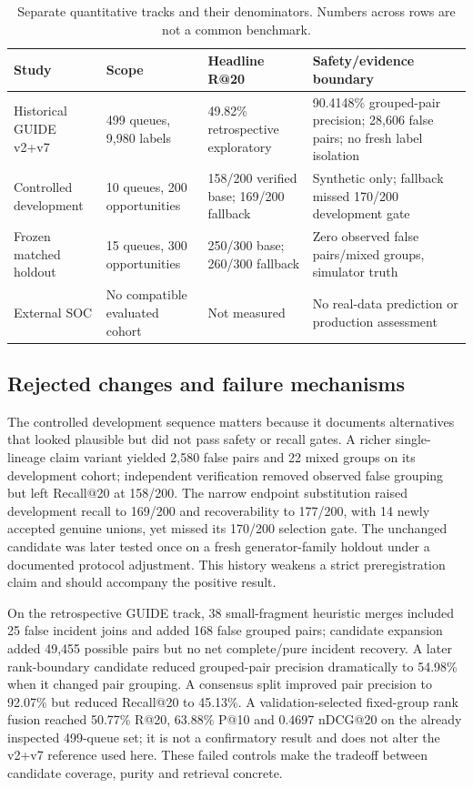 \begin{table}[t]\centering\footnotesize\caption{Separate quantitative tracks and their denominators. Numbers across rows are not a common benchmark.}\label{tab:cross_track}
\begin{tabularx}{\textwidth}{@{}p{}p{}Y Y@{}}\toprule
Study & Scope & Headline R@20 & Safety/evidence boundary\\\midrule
Historical GUIDE v2+v7 & 499 queues, 9,980 labels & 49.82\% retrospective exploratory & 90.4148\% grouped-pair precision; 28,606 false pairs; no fresh label isolation\\
Controlled development & 10 queues, 200 opportunities & 158/200 verified base; 169/200 fallback & Synthetic only; fallback missed 170/200 development gate\\
Frozen matched holdout & 15 queues, 300 opportunities & 250/300 base; 260/300 fallback & Zero observed false pairs/mixed groups, simulator truth\\
External SOC & No compatible evaluated cohort & Not measured & No real-data prediction or production assessment\\\bottomrule
\end{tabularx}\end{table}

\subsection{Rejected changes and failure mechanisms}
The controlled development sequence matters because it documents alternatives that looked plausible but did not pass safety or recall gates. A richer single-lineage claim variant yielded 2,580 false pairs and 22 mixed groups on its development cohort; independent verification removed observed false grouping but left Recall@20 at 158/200. The narrow endpoint substitution raised development recall to 169/200 and recoverability to 177/200, with 14 newly accepted genuine unions, yet missed its 170/200 selection gate. The unchanged candidate was later tested once on a fresh generator-family holdout under a documented protocol adjustment. This history weakens a strict preregistration claim and should accompany the positive result.

On the retrospective GUIDE track, 38 small-fragment heuristic merges included 25 false incident joins and added 168 false grouped pairs; candidate expansion added 49,455 possible pairs but no net complete/pure incident recovery. A later rank-boundary candidate reduced grouped-pair precision dramatically to 54.98\% when it changed pair grouping. A consensus split improved pair precision to 92.07\% but reduced Recall@20 to 45.13\%. A validation-selected fixed-group rank fusion reached 50.77\% R@20, 63.88\% P@10 and 0.4697 nDCG@20 on the already inspected 499-queue set; it is not a confirmatory result and does not alter the v2+v7 reference used here. These failed controls make the tradeoff between candidate coverage, purity and retrieval concrete.


